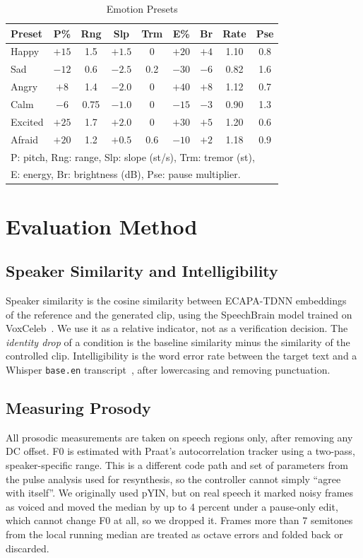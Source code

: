 \documentclass[conference]{IEEEtran}
\begin{document}
\begin{table}[htbp]
\caption{Emotion Presets}
\begin{center}
\setlength{\tabcolsep}{3pt}
\begin{tabular}{|l|c|c|c|c|c|c|c|c|}
\hline
\textbf{Preset} & \textbf{P\%} & \textbf{Rng} & \textbf{Slp} & \textbf{Trm} & \textbf{E\%} & \textbf{Br} & \textbf{Rate} & \textbf{Pse} \\
\hline
Happy & $+15$ & 1.5 & $+1.5$ & 0 & $+20$ & $+4$ & 1.10 & 0.8 \\
Sad & $-12$ & 0.6 & $-2.5$ & 0.2 & $-30$ & $-6$ & 0.82 & 1.6 \\
Angry & $+8$ & 1.4 & $-2.0$ & 0 & $+40$ & $+8$ & 1.12 & 0.7 \\
Calm & $-6$ & 0.75 & $-1.0$ & 0 & $-15$ & $-3$ & 0.90 & 1.3 \\
Excited & $+25$ & 1.7 & $+2.0$ & 0 & $+30$ & $+5$ & 1.20 & 0.6 \\
Afraid & $+20$ & 1.2 & $+0.5$ & 0.6 & $-10$ & $+2$ & 1.18 & 0.9 \\
\hline
\multicolumn{9}{l}{P: pitch, Rng: range, Slp: slope (st/s), Trm: tremor (st),}\\
\multicolumn{9}{l}{E: energy, Br: brightness (dB), Pse: pause multiplier.}
\end{tabular}
\label{tab:presets}
\end{center}
\end{table}

\section{Evaluation Method}\label{sec:eval}

\subsection{Speaker Similarity and Intelligibility}
Speaker similarity is the cosine similarity between ECAPA-TDNN embeddings~\cite{b17} of the
reference and the generated clip, using the SpeechBrain model trained on VoxCeleb~\cite{b18}. We use it
as a relative indicator, not as a verification decision. The \emph{identity drop} of a condition
is the baseline similarity minus the similarity of the controlled clip. Intelligibility is the word
error rate between the target text and a Whisper \texttt{base.en} transcript~\cite{b16}, after
lowercasing and removing punctuation.

\subsection{Measuring Prosody}
All prosodic measurements are taken on speech regions only, after removing any DC offset. F0 is
estimated with Praat's autocorrelation tracker using a two-pass, speaker-specific range. This is a
different code path and set of parameters from the pulse analysis used for resynthesis, so the
controller cannot simply ``agree with itself''. We originally used pYIN, but on real speech it
marked noisy frames as voiced and moved the median by up to 4 percent under a pause-only edit,
which cannot change F0 at all, so we dropped it. Frames more than 7 semitones from the local
running median are treated as octave errors and folded back or discarded.
\end{document}
